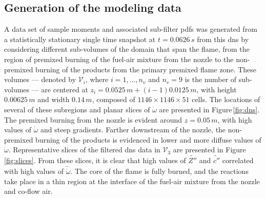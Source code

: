 \documentclass[review]{elsarticle}
\newcommand{\wt}[1]{\widetilde{#1}}
\begin{document}
\subsection{Generation of the modeling data}\label{sec:gen}

A data set of sample moments and associated sub-filter \glspl{pdf} was
generated from a statistically stationary single time snapshot at
$t=0.0626\,\unit{s}$ from this \gls{dns} by considering different
sub-volumes of the domain that span the flame, from the region of
premixed burning of the fuel-air mixture from the nozzle to the
non-premixed burning of the products from the primary premixed flame
zone. These volumes --- denoted by $\mathcal{V}_i$, where $i=1, \dots, n_v$
and $n_v = 9$ is the number of sub-volumes --- are centered at
$z_i = 0.0525\,\unit{m} + (i-1) 0.0125 \,\unit{m}$, with height
$0.00625\,\unit{m}$ and width $0.14\,\unit{m}$, composed of
$1146 \times 1146 \times 51$ cells. The locations of several of these
subregions and planar slices of $\dot{\omega}$ are presented in
Figure\,\ref{fig:dns}. The premixed burning from the nozzle is evident
around $z=0.05\,\unit{m}$, with high values of $\dot{\omega}$ and steep
gradients. Farther downstream of the nozzle, the non-premixed burning
of the products is evidenced in lower and more diffuse values of
$\dot{\omega}$. Representative slices of the filtered \gls{dns} data
in $\mathcal{V}_3$ are presented in Figure\,\ref{fig:slices}. From
these slices, it is clear that high values of $\wt{Z''}$ and
$\wt{c''}$ correlated with high values of $\wt{\dot{\omega}}$. The
core of the flame is fully burned, and the reactions take place in a
thin region at the interface of the fuel-air mixture from the nozzle
and co-flow air.
\end{document}
